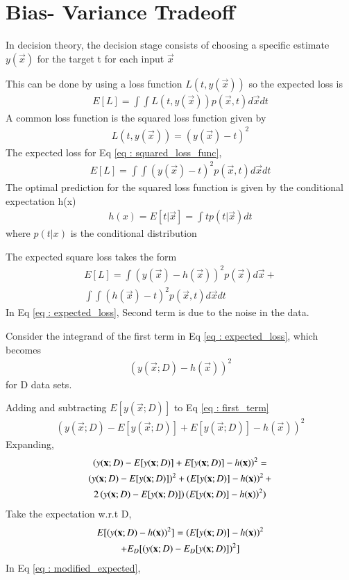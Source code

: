 \documentclass[journal,12pt,twocolumn]{IEEEtran}
\begin{document}
\section{Bias- Variance Tradeoff}
In decision theory, the decision stage consists of choosing a specific estimate $y(\vec{x})$ for the target t for each input $\vec{x}$

This can be done by using a loss function $L(t,y(\vec{x}))$ so the expected loss is
\begin{align}
    E[L] = \int \int L(t,y(\vec{x}))p(\vec{x},t)d\vec{x}dt
\end{align}
A common loss function is the squared loss function given by
\begin{align}
    L(t,y(\vec{x})) = (y(\vec{x}) - t)^2 \label{eq : squared_loss_func}
\end{align}
The expected loss for Eq \eqref{eq : squared_loss_func},
\begin{align}
    E[L] = \int \int (y(\vec{x}) - t)^2p(\vec{x},t)d\vec{x}dt
\end{align}
The optimal prediction for the squared loss function is given by the conditional expectation h(x)
\begin{align}
    h(x) = E[t |\vec{x}] = \int t p(t |\vec{x})dt
\end{align}
where $p(t | x)$ is the conditional distribution

The expected square loss takes the form
\begin{multline}
    E[L] = \int(y(\vec{x})-h(\vec{x}))^2p(\vec{x})d\vec{x} +\\ 
    \int \int(h(\vec{x}) - t)^2p(\vec{x},t)d\vec{x} dt \label{eq : expected_loss}
\end{multline}
In Eq \eqref{eq : expected_loss},
Second term is due to the noise in the data.

Consider the integrand of the first term in Eq \eqref{eq : expected_loss}, which becomes
\begin{align}
    (y(\vec{x};D) - h(\vec{x}))^2 \label{eq : first_term}
\end{align}
for D data sets.

Adding and subtracting $E[y(\vec{x};D)]$ to Eq \eqref{eq : first_term}
\begin{align}
    (y(\vec{x};D) - E[y(\vec{x};D)] + E[y(\vec{x};D)]- h(\vec{x}))^2
\end{align}
Expanding,
\begin{multline}
    \left(y(\mathbf{x};D) - E[y(\mathbf{x};D)] + E[y(\mathbf{x};D)]- h(\mathbf{x})\right)^2 = \\
      \left(y(\mathbf{x};D) - E[y(\mathbf{x};D)]\right)^2 + \left(E[y(\mathbf{x};D)]- h(\mathbf{x})\right)^2 + \\
      2\left(y(\mathbf{x};D) - E[y(\mathbf{x};D)]\right)\left(E[y(\mathbf{x};D)]- h(\mathbf{x})\right)^2)
\end{multline}
Take the expectation w.r.t D,
\begin{multline}
    E[(y(\mathbf{x};D) - h(\mathbf{x}))^2] = \left(E[y(\mathbf{x};D)]- h(\mathbf{x})\right)^2\\
       + E_{D}[(y(\mathbf{x};D) - E_{D}[y(\mathbf{x};D)])^2] \label{eq : modified_expected}
\end{multline}
In Eq \eqref{eq : modified_expected}, 
\end{document}
